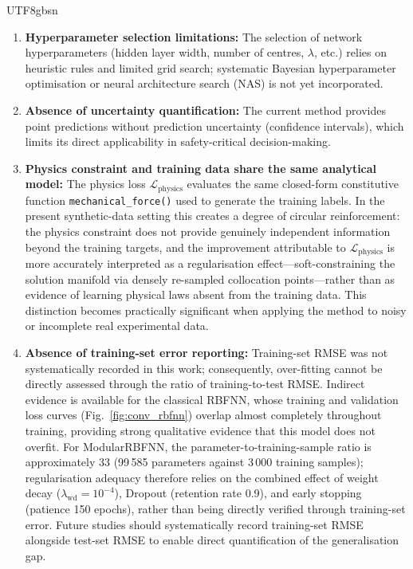 \documentclass[a4paper,12pt]{report}
\newcommand{\Lphys}{\mathcal{L}_{\text{physics}}}
\begin{document}
\begin{CJK}{UTF8}{gbsn}
\begin{enumerate}
  \item \textbf{Hyperparameter selection limitations:} The selection of network
    hyperparameters (hidden layer width, number of centres, $\lambda$, etc.) relies on
    heuristic rules and limited grid search; systematic Bayesian hyperparameter
    optimisation or neural architecture search (NAS) is not yet incorporated.
  \item \textbf{Absence of uncertainty quantification:} The current method provides point
    predictions without prediction uncertainty (confidence intervals), which limits its
    direct applicability in safety-critical decision-making.
  \item \textbf{Physics constraint and training data share the same analytical model:}
    The physics loss $\Lphys$ evaluates the same closed-form constitutive function
    \texttt{mechanical\_force()} used to generate the training labels.
    In the present synthetic-data setting this creates a degree of circular reinforcement:
    the physics constraint does not provide genuinely independent information beyond the
    training targets, and the improvement attributable to $\Lphys$ is more accurately
    interpreted as a regularisation effect---soft-constraining the solution manifold via
    densely re-sampled collocation points---rather than as evidence of learning physical
    laws absent from the training data. This distinction becomes practically significant
    when applying the method to noisy or incomplete real experimental data.
  \item \textbf{Absence of training-set error reporting:} Training-set RMSE was not
    systematically recorded in this work; consequently, over-fitting cannot be
    directly assessed through the ratio of training-to-test RMSE. Indirect evidence is
    available for the classical RBFNN, whose training and validation loss curves
    (Fig.~\ref{fig:conv_rbfnn}) overlap almost completely throughout training, providing
    strong qualitative evidence that this model does not overfit. For ModularRBFNN,
    the parameter-to-training-sample ratio is approximately 33 (99\,585 parameters
    against 3\,000 training samples); regularisation adequacy therefore relies on the
    combined effect of weight decay ($\lambda_{\mathrm{wd}} = 10^{-4}$), Dropout
    (retention rate 0.9), and early stopping (patience 150 epochs), rather than being
    directly verified through training-set error. Future studies should systematically
    record training-set RMSE alongside test-set RMSE to enable direct quantification
    of the generalisation gap.
\end{enumerate}


\end{CJK}
\end{document}
